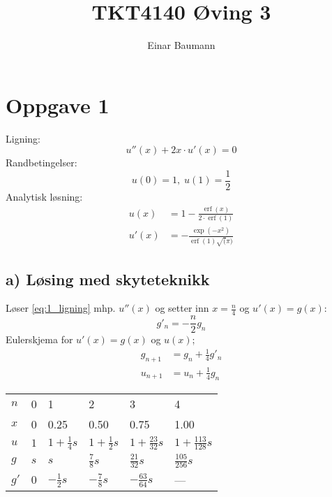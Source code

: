 

\usepackage{cancel}

\DeclareMathOperator\erf{erf}


\author{Einar Baumann}
\title{TKT4140 Øving 3}
\maketitle

\section*{Oppgave 1} %
\label{sec:oppgave_1}

Ligning:
\begin{equation}
  u''(x) + 2x \cdot u'(x) = 0
  \label{eq:1_ligning}
\end{equation}
Randbetingelser:
\begin{equation}
  u(0) = 1, \; u(1) = \frac{1}{2}
\end{equation}
Analytisk løsning:
\begin{align}
  u(x) & = 1 - \frac{\erf(x)}{2\cdot \erf(1)} \\
  u'(x) & = -\frac{\exp(-x^2)}{\erf(1)\sqrt(\pi)}
\end{align}

\pagebreak
\subsection*{a) Løsing med skyteteknikk} %
\label{sub:1a}
Løser \eqref{eq:1_ligning} mhp. $u''(x)$ og setter inn $x=\frac{n}{4}$ og $u'(x) = g(x)$:
\begin{equation}
  g'_n = -\frac{n}{2}g_n
\end{equation}
Eulerskjema for $u'(x)=g(x)$ og $u(x)$;
\begin{align}
  g_{n+1} &= g_n + \frac{1}{4} g'_n \\
  u_{n+1} &= u_n + \frac{1}{4} g_n
\end{align}

\begin{table}[H]
\centering
\begin{tabularx}{1.0\textwidth}{X|XXXXX}
\toprule
$n$  & 0   & 1                & 2                & 3     & 4    \\
$x$  & 0   & 0.25             & 0.50             & 0.75  & 1.00 \\
\midrule
$u$  & $1$ & $1+\frac{1}{4}s$ & $1+\frac{1}{2}s$ & $1+\frac{23}{32}s$ & $1+\frac{113}{128}s$ \\
$g$  & $s$ & $s$              & $\frac{7}{8}s$   & $\frac{21}{32}s$   & $\frac{105}{256}s$   \\
$g'$ & $0$ & $-\frac{1}{2}s$  & $-\frac{7}{8}s$  & $-\frac{63}{64}s$  & ---                  \\
\bottomrule
\end{tabularx}
\end{table}


